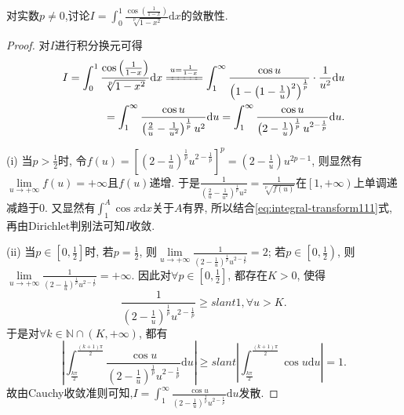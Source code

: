 \documentclass[../../main.tex]{subfiles}
\begin{document}
\begin{example}
对实数$p\ne 0$,讨论$I = \int_0^1{\frac{\cos(\frac{1}{1 - x})}{\sqrt[p]{1 - x^2}}\mathrm{d}x}$的敛散性.
\end{example}
\begin{proof}
对$I$进行积分换元可得
\begin{align}
I=\int_0^1{\frac{\cos\left(\frac{1}{1-x}\right)}{\sqrt[p]{1-x^2}}\mathrm{d}x}\xlongequal{u=\frac{1}{1-x}}\int_1^{\infty}{\frac{\cos u}{\left( 1-\left( 1-\frac{1}{u} \right) ^2 \right) ^{\frac{1}{p}}}\cdot \frac{1}{u^2}\mathrm{d}u} \notag \\
=\int_1^{\infty}{\frac{\cos u}{\left( \frac{2}{u}-\frac{1}{u^2} \right) ^{\frac{1}{p}}u^2}\mathrm{d}u}=\int_1^{\infty}{\frac{\cos u}{\left( 2-\frac{1}{u} \right) ^{\frac{1}{p}}u^{2-\frac{1}{p}}}\mathrm{d}u}.\label{eq:integral-transform111}
\end{align}

(i) 当$p>\frac{1}{2}$时, 令$f\left( u \right) =\left[ \left( 2-\frac{1}{u} \right) ^{\frac{1}{p}}u^{2-\frac{1}{p}} \right] ^p=\left( 2-\frac{1}{u} \right) u^{2p-1}$, 则显然有$\underset{u\rightarrow +\infty}{\lim}f\left( u \right) =+\infty$且$f\left( u \right)$递增. 于是$\frac{1}{\left( \frac{2}{u}-\frac{1}{u^2} \right) ^{\frac{1}{p}}u^2}=\frac{1}{\sqrt[p]{f\left( u \right)}}$在$\left[ 1,+\infty \right)$上单调递减趋于$0$. 又显然有$\int_1^A{\cos x\mathrm{d}x}$关于$A$有界, 所以结合\eqref{eq:integral-transform111}式, 再由Dirichlet判别法可知$I$收敛.

(ii) 当$p\in \left[ 0,\frac{1}{2} \right]$时, 若$p=\frac{1}{2}$, 则$\underset{u\rightarrow +\infty}{\lim}\frac{1}{\left( 2-\frac{1}{u} \right) ^{\frac{1}{p}}u^{2-\frac{1}{p}}}=2$; 若$p\in \left[ 0,\frac{1}{2} \right)$, 则$\underset{u\rightarrow +\infty}{\lim}\frac{1}{\left( 2-\frac{1}{u} \right) ^{\frac{1}{p}}u^{2-\frac{1}{p}}}=+\infty$. 因此对$\forall p\in \left[ 0,\frac{1}{2} \right]$, 都存在$K>0$, 使得
$$\frac{1}{\left( 2-\frac{1}{u} \right) ^{\frac{1}{p}}u^{2-\frac{1}{p}}}\geqslant slant 1,\forall u>K.$$
于是对$\forall k\in \mathbb{N} \cap \left( K,+\infty \right)$, 都有
$$\left| \int_{\frac{k\pi}{2}}^{\frac{\left( k+1 \right) \pi}{2}}{\frac{\cos u}{\left( 2-\frac{1}{u} \right) ^{\frac{1}{p}}u^{2-\frac{1}{p}}}\mathrm{d}u} \right|\geqslant slant \left| \int_{\frac{k\pi}{2}}^{\frac{\left( k+1 \right) \pi}{2}}{\cos u\mathrm{d}u} \right|=1.$$
故由Cauchy收敛准则可知,$I=\int_1^{\infty}{\frac{\cos u}{\left( 2-\frac{1}{u} \right) ^{\frac{1}{p}}u^{2-\frac{1}{p}}}\mathrm{d}u}$发散.


\end{proof}
\end{document}
